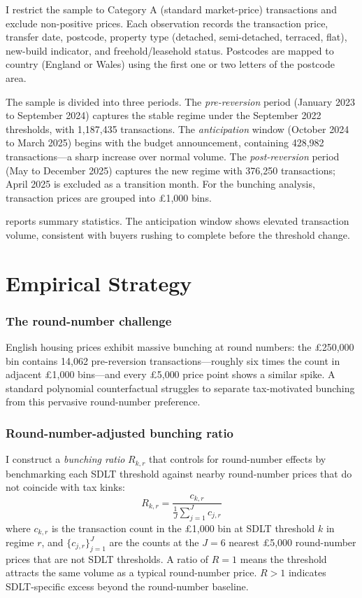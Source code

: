 \documentclass[12pt]{article}
\begin{document}
I restrict the sample to Category A (standard market-price) transactions and exclude non-positive prices. Each observation records the transaction price, transfer date, postcode, property type (detached, semi-detached, terraced, flat), new-build indicator, and freehold/leasehold status. Postcodes are mapped to country (England or Wales) using the first one or two letters of the postcode area.

The sample is divided into three periods. The \textit{pre-reversion} period (January 2023 to September 2024) captures the stable regime under the September 2022 thresholds, with 1,187,435 transactions. The \textit{anticipation} window (October 2024 to March 2025) begins with the budget announcement, containing 428,982 transactions---a sharp increase over normal volume. The \textit{post-reversion} period (May to December 2025) captures the new regime with 376,250 transactions; April 2025 is excluded as a transition month. For the bunching analysis, transaction prices are grouped into \pounds 1,000 bins.

 reports summary statistics. The anticipation window shows elevated transaction volume, consistent with buyers rushing to complete before the threshold change.




\section{Empirical Strategy}\label{sec:method}

\subsubsection*{The round-number challenge} English housing prices exhibit massive bunching at round numbers: the \pounds 250,000 bin contains 14,062 pre-reversion transactions---roughly six times the count in adjacent \pounds 1,000 bins---and every \pounds 5,000 price point shows a similar spike. A standard polynomial counterfactual \citep{chetty2011adjustment, kleven2016bunching} struggles to separate tax-motivated bunching from this pervasive round-number preference.

\subsubsection*{Round-number-adjusted bunching ratio} I construct a \textit{bunching ratio} $R_{k,r}$ that controls for round-number effects by benchmarking each SDLT threshold against nearby round-number prices that do not coincide with tax kinks:
\begin{equation}
R_{k,r} = \frac{c_{k,r}}{\frac{1}{J}\sum_{j=1}^{J} c_{j,r}}
\end{equation}
where $c_{k,r}$ is the transaction count in the \pounds 1,000 bin at SDLT threshold $k$ in regime $r$, and $\{c_{j,r}\}_{j=1}^{J}$ are the counts at the $J = 6$ nearest \pounds 5,000 round-number prices that are not SDLT thresholds. A ratio of $R = 1$ means the threshold attracts the same volume as a typical round-number price. $R > 1$ indicates SDLT-specific excess beyond the round-number baseline.
\end{document}
